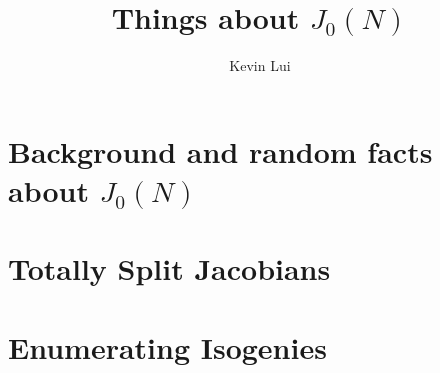 \documentclass{article}
\author{Kevin Lui}
\title{Things about $J_0(N)$}
\begin{document}
\maketitle

\newpage

\tableofcontents

\newpage

\section{Background and random facts about $J_0(N)$}

\section{Totally Split Jacobians}

\section{Enumerating Isogenies}



\end{document}
